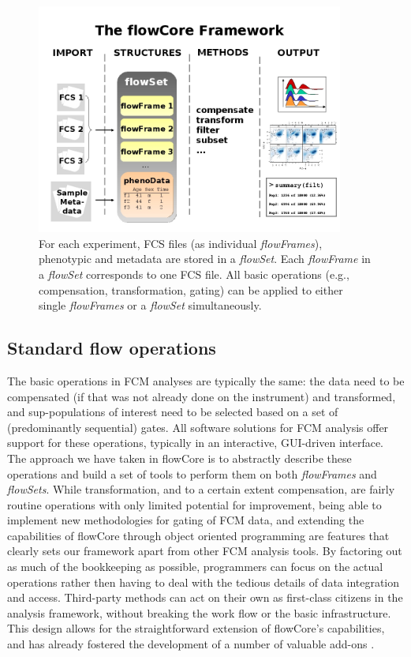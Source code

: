 \documentclass[12pt]{article}
\newcommand{\Rpackage}[1]{{\textsf{#1}}}
\newcommand{\Rclass}[1]{{\textit{#1}}}
\begin{document}
\begin{figure}
\centering
\includegraphics[width=0.9\textwidth]{Figure1-flowCoreFrameWork.jpg}
\caption{\label{fig1:FrameWork}{For each experiment, FCS files (as
    individual \Rclass{flowFrames}), phenotypic and metadata are
    stored in a \Rclass{flowSet}. Each \Rclass{flowFrame} in a
    \Rclass{flowSet} corresponds to one FCS file. All basic operations
    (e.g., compensation, transformation, gating) can be applied to
    either single \Rclass{flowFrames} or a \Rclass{flowSet}
    simultaneously.}}
\end{figure}




\subsection*{Standard flow operations}

The basic operations in FCM analyses are typically the same: the data
need to be compensated (if that was not already done on the
instrument) and transformed, and sup-populations of interest need to
be selected based on a set of (predominantly sequential) gates. All
software solutions for FCM analysis offer support for these
operations, typically in an interactive, GUI-driven interface. The
approach we have taken in \Rpackage{flowCore} is to abstractly
describe these operations and build a set of tools to perform them on
both \Rclass{flowFrames} and \Rclass{flowSets}. While transformation,
and to a certain extent compensation, are fairly routine operations
with only limited potential for improvement, being able to implement
new methodologies for gating of FCM data, and extending the
capabilities of \Rpackage{flowCore} through object oriented
programming are features that clearly sets our framework apart from
other FCM analysis tools. By factoring out as much of the bookkeeping
as possible, programmers can focus on the actual operations rather
then having to deal with the tedious details of data integration and
access. Third-party methods can act on their own as first-class
citizens in the analysis framework, without breaking the work flow or
the basic infrastructure. This design allows for the straightforward
extension of \Rpackage{flowCore}'s capabilities, and has already
fostered the development of a number of valuable add-ons
\citep{lo2008agf,sarkar2008ufv}.
\end{document}
